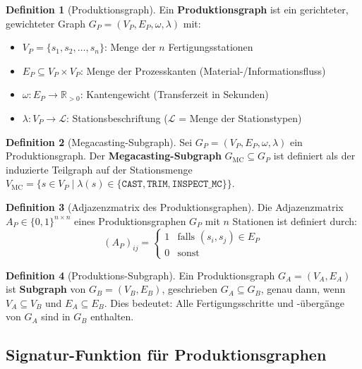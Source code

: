 ﻿\documentclass[a4paper,12pt]{article}
\theoremstyle{definition}
\newtheorem{definition}{Definition}
\begin{document}
\begin{definition}[Produktionsgraph]
\label{def:produktionsgraph}
Ein \textbf{Produktionsgraph} ist ein gerichteter, gewichteter Graph
$G_P = (V_P, E_P, \omega, \lambda)$ mit:
\begin{itemize}
\item $V_P = \{s_1, s_2, \ldots, s_n\}$: Menge der $n$ Fertigungsstationen
\item $E_P \subseteq V_P \times V_P$: Menge der Prozesskanten (Material-/Informationsfluss)
\item $\omega: E_P \to \mathbb{R}_{>0}$: Kantengewicht (Transferzeit in Sekunden)
\item $\lambda: V_P \to \mathcal{L}$: Stationsbeschriftung ($\mathcal{L}$ = Menge der Stationstypen)
\end{itemize}
\end{definition}

\begin{definition}[Megacasting-Subgraph]
\label{def:megacasting}
Sei $G_P = (V_P, E_P, \omega, \lambda)$ ein Produktionsgraph. Der
\textbf{Megacasting-Subgraph} $G_{\mathrm{MC}} \subseteq G_P$ ist definiert als
der induzierte Teilgraph auf der Stationsmenge
$V_{\mathrm{MC}} = \{s \in V_P \mid \lambda(s) \in \{\texttt{CAST}, \texttt{TRIM}, \texttt{INSPECT\_MC}\}\}$.
\end{definition}

\begin{definition}[Adjazenzmatrix des Produktionsgraphen]
\label{def:adjazenz}
Die Adjazenzmatrix $A_P \in \{0,1\}^{n \times n}$ eines Produktionsgraphen $G_P$
mit $n$ Stationen ist definiert durch:
\[
(A_P)_{ij} = \begin{cases}
  1 & \text{falls } (s_i, s_j) \in E_P \\
  0 & \text{sonst}
\end{cases}
\]
\end{definition}

\begin{definition}[Produktions-Subgraph]
\label{def:subgraph}
Ein Produktionsgraph $G_A = (V_A, E_A)$ ist \textbf{Subgraph} von
$G_B = (V_B, E_B)$, geschrieben $G_A \subseteq G_B$, genau dann, wenn
$V_A \subseteq V_B$ und $E_A \subseteq E_B$. Dies bedeutet: Alle Fertigungsschritte
und -übergänge von $G_A$ sind in $G_B$ enthalten.
\end{definition}

\subsection{Signatur-Funktion für Produktionsgraphen}
\end{document}
